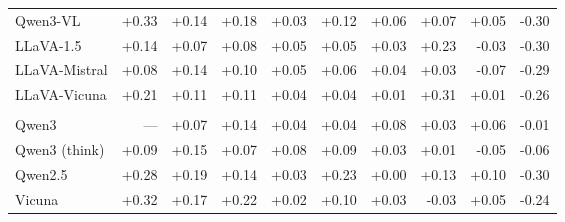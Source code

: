 \begin{table}[t]
\begin{tabular}{>{\raggedright\arraybackslash}p{2.1cm}rrrrrrrrr}
Qwen3-VL & \cellcolor{orange!25}+0.33 & +0.14 & \cellcolor{orange!25}+0.18 & \cellcolor{blue!10}+0.03 & \cellcolor{orange!25}+0.12 & +0.06 & \cellcolor{orange!25}+0.07 & \cellcolor{orange!25}+0.05 & \cellcolor{blue!10}-0.30 \\
LLaVA-1.5 & +0.14 & \cellcolor{blue!10}+0.07 & +0.08 & +0.05 & +0.05 & +0.03 & \cellcolor{orange!25}+0.23 & -0.03 & \cellcolor{blue!10}-0.30 \\
LLaVA-Mistral & \cellcolor{blue!10}+0.08 & +0.14 & +0.10 & +0.05 & +0.06 & +0.04 & +0.03 & \cellcolor{blue!10}-0.07 & \cellcolor{blue!10}-0.29 \\
LLaVA-Vicuna & \cellcolor{orange!25}+0.21 & +0.11 & +0.11 & +0.04 & +0.04 & \cellcolor{blue!10}+0.01 & \cellcolor{orange!25}+0.31 & +0.01 & \cellcolor{blue!10}-0.26 \\
\midrule
\multicolumn{10}{c}{\textit{SA-LLMs}} \\
\midrule
Qwen3 & --- & \cellcolor{blue!10}+0.07 & \cellcolor{orange!25}+0.14 & +0.04 & +0.04 & \cellcolor{orange!25}+0.08 & +0.03 & \cellcolor{orange!25}+0.06 & \cellcolor{orange!25}-0.01 \\
Qwen3 (think) & \cellcolor{blue!10}+0.09 & \cellcolor{orange!25}+0.15 & \cellcolor{blue!10}+0.07 & +0.08 & \cellcolor{orange!25}+0.09 & +0.03 & +0.01 & \cellcolor{blue!10}-0.05 & -0.06 \\
Qwen2.5 & \cellcolor{orange!25}+0.28 & \cellcolor{orange!25}+0.19 & +0.14 & \cellcolor{blue!10}+0.03 & \cellcolor{orange!25}+0.23 & \cellcolor{blue!10}+0.00 & \cellcolor{orange!25}+0.13 & \cellcolor{orange!25}+0.10 & \cellcolor{blue!10}-0.30 \\
Vicuna & \cellcolor{orange!25}+0.32 & \cellcolor{orange!25}+0.17 & \cellcolor{orange!25}+0.22 & \cellcolor{blue!10}+0.02 & \cellcolor{orange!25}+0.10 & +0.03 & \cellcolor{blue!10}-0.03 & \cellcolor{orange!25}+0.05 & \cellcolor{blue!10}-0.24 \\
\bottomrule
\end{tabular}
\end{table}
